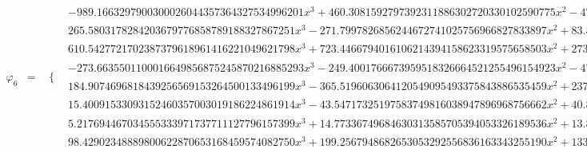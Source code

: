 \documentclass{article}
\begin{document}
\begin{landscape}
\begin{eqnarray*}
\begin{array}{cc}
\end{array}\\
\varphi_6 & = & \begin{array}{cc}
 \{ & 
\begin{array}{cc}
 -989.1663297900300026044357364327534996201 x^3+460.3081592797392311886302720330102590775 x^2-47.20549465929557359806937412089344522303 x-0.6895993730511576338826875942282967010232 & x\geq 0\land x<\frac{1}{4} \\
 265.5803178284203679776858789188327867251 x^3-271.7997826856244672741025756966827833897 x^2+83.58347989492683114914924686553064732082 x-7.235513007809814707112190097597040406932 & x\geq \frac{1}{4}\land x<\frac{1}{2} \\
 610.5427721702387379618961416221049621798 x^3+723.4466794016106214394158623319575658503 x^2+273.4292479476626374852998456936488984403 x+32.48188156000424060351046749033069429823 & x\geq -\frac{1}{2}\land x<-\frac{1}{4} \\
 -273.6635501100016649856875245870216885293 x^3-249.4001766673959518326664521255496154923 x^2-47.20549465929557359806937412089344522303 x-0.6895993730511576338826875942282967010232 & x\geq -\frac{1}{4}\land x<0 \\
 184.9074696818439256569153264500133496199 x^3-365.5196063064120549095493375843886535459 x^2+237.8079396256467505251739231048510953060 x-50.83368094965082219616651868672836722229 & x\geq \frac{1}{2}\land x<\frac{3}{4} \\
 15.40091533093152460357003019186224861914 x^3-43.54717325197583749816038947896968756662 x^2+40.89160051115710118561068838235262927581 x-12.74534259011278829102032909524519032834 & x\geq \frac{3}{4}\land x<1 \\
 5.217694467034555333971737711127796157399 x^3+14.77336749684630313585705394053326189536 x^2+13.89365159258894026979889474768313531852 x+4.337978562777192467913578518277669580559 & x\geq -1\land x<-\frac{3}{4} \\
 98.42902348889800622870653168459574082750 x^3+199.2567948682653053292556836163343255190 x^2+133.3246749253228701750318744311575741232 x+29.46284759700309450926782529580218955347 & x\geq -\frac{3}{4}\land x<-\frac{1}{2}
\end{array}

\end{array}\end{eqnarray*}
\end{landscape}
\end{document}
